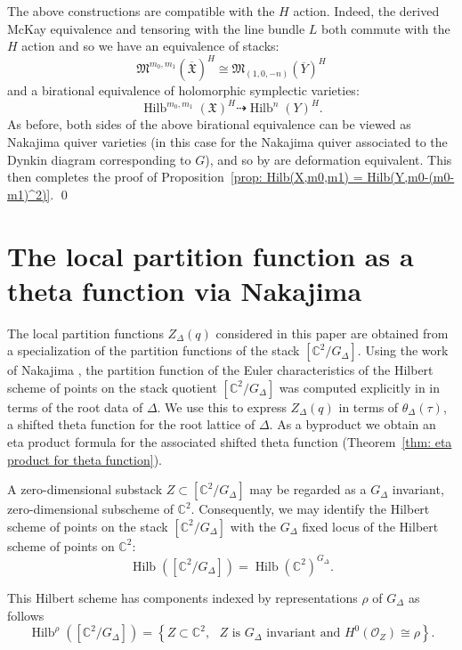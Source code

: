 \documentclass{amsart}
\theoremstyle{definition}
\newcommand{\CC} {{\mathbb C}}          %
\newcommand{\X}{\mathfrak{X}}
\newcommand{\Xbar}{\overline{\mathfrak{X}}}
\newcommand{\Ybar}{\overline{Y}}
\newcommand{\M}{\mathfrak{M}}
\renewcommand{\O}{\mathcal{O}}
\newcommand{\Hilb}{\operatorname{Hilb}}
\begin{document}
The above constructions are compatible with the $H$ action. Indeed,
the derived McKay equivalence and tensoring with the line bundle $L$
both commute with the $H$ action and so we have an equivalence of
stacks: 
\[
\M^{m_{0},m_{1}}(\Xbar )^{H} \cong \M_{(1,0,-n)}(\Ybar )^{H}
\]
and a birational equivalence of holomorphic symplectic varieties:
\[
\Hilb^{m_{0},m_{1}}(\X )^{H} \dashrightarrow \Hilb^{n}(Y)^{H}.
\]
As before, both sides of the above birational equivalence can be
viewed as Nakajima quiver varieties (in this case for the Nakajima
quiver associated to the Dynkin diagram corresponding to $G$), and so
by \cite[Cor~4.2]{Nakajima1994Duke} are deformation equivalent. This
then completes the proof of Proposition~\ref{prop: Hilb(X,m0,m1) =
Hilb(Y,m0-(m0-m1)^2)}. \qed


\section{The local partition function as a theta function via Nakajima}\label{sec: local partition functions}


The local partition functions $Z_{\Delta}(q)$ considered in this paper
are obtained from a specialization of the partition functions of the
stack $[\CC^{2} /G_{\Delta}]$.  Using the work of Nakajima
\cite{nakajima2002geometric}, the partition function of the Euler
characteristics of the Hilbert scheme of points on the stack quotient
$[\CC^{2}/G_{\Delta}]$ was computed explicitly in
\cite{gyenge2015euler} in terms of the root data of $\Delta$.  We use
this to express $Z_{\Delta}(q)$ in terms of $\theta_{\Delta}(\tau )$,
a shifted theta function for the root lattice of $\Delta$. As a
byproduct we obtain an eta product formula for the associated shifted
theta function (Theorem~\ref{thm: eta product for theta function}).



A zero-dimensional substack $Z\subset [\CC^{2}/G_{\Delta}]$ may be
regarded as a $G_{\Delta}$ invariant, zero-dimensional subscheme of
$\CC^{2}$. Consequently, we may identify the Hilbert scheme of points
on the stack $[\CC^{2}/G_{\Delta}]$ with the $G_{\Delta}$ fixed locus
of the Hilbert scheme of points on $\CC^{2}$: 
\[
\Hilb \left([\CC^{2}/G_{\Delta}] \right) = \Hilb
(\CC^{2})^{G_{\Delta}} .
\]

This Hilbert scheme has components indexed by representations $\rho$
of $G_{\Delta}$ as follows
\begin{equation*}
\Hilb^{\rho} \left([\CC^{2}/G_{\Delta}] \right) = \left\{ Z\subset
\CC^{2}, \text{ $Z$ is $G_{\Delta}$ invariant and $H^{0}(\O_{Z})\cong
\rho $} \right\}.
\end{equation*}
\end{document}
